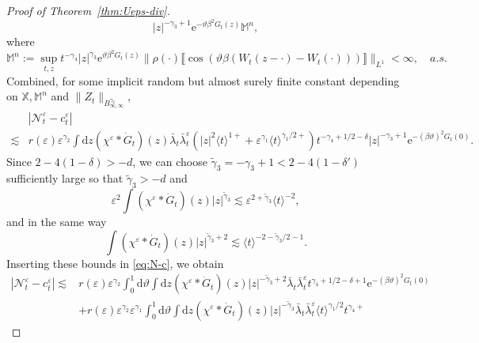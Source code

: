\documentclass[11pt, a4paper]{scrartcl}
\numberwithin{equation}{section}
\theoremstyle{plain}
\theoremstyle{remark}
\newcommand{\assign}{:=}
\newcommand{\mathd}{\mathrm{d}}
\newcommand{\mathe}{\mathrm{e}}
\begin{document}
\begin{proof}[Proof of Theorem~\ref{thm:Ueps-div}]
\[		| z |^{- \gamma_3 + 1} \mathe^{- \vartheta \beta^2 G_t (z)} \mathbb{M}^n,
	\]
	where
	\[ \mathbb{M}^n \assign \sup_{t, z} t^{- \gamma_4} | z |^{\gamma_3}
		\mathe^{\vartheta \beta^2 G_t (z)} \| \rho (\cdot) \llbracket \cos
		(\vartheta \beta (W_t (z - \cdot) - W_t (\cdot))) \rrbracket \|_{L^1}  <
		\infty, \quad a.s. \]
	Combined, for some implicit random but almost surely finite constant
	depending on $\mathbb{X}, \mathbb{M}^n$ and $\| Z_t
		\|_{B^{\gamma_2}_{\infty, \infty}}$,
	\begin{equation}
		\begin{aligned}
			         & | \mathcal{N}^{\varepsilon}_t - c_t^{\varepsilon} |  \\
			\lesssim & r (\varepsilon) \varepsilon^{\gamma_2} \int \mathd z
			(\chi^{\varepsilon} \ast \dot{G}_t ) (z) \bar{\lambda}_t
			\bar{\lambda}_t^{\varepsilon} (| z |^2 \langle t \rangle^{1 +} +
			\varepsilon^{\gamma_1} \langle t \rangle^{\gamma_1 / 2 +}) t^{- \gamma_4
					+ 1 / 2 - \delta} | z |^{- \gamma_3 + 1} \mathe^{- (\beta \vartheta)^2
				G_t (0)} .
		\end{aligned}  \label{eq:N-c}
	\end{equation}
	Since $2 - 4 (1 - \delta) > - d$, we can choose $\tilde{\gamma}_3 = -
		\gamma_3 + 1 < 2 - 4 (1 - \delta')$ sufficiently large so that
	$\tilde{\gamma}_3 > - d$ and
	\[ \varepsilon^2 \int (\chi^{\varepsilon} \ast \dot{G}_t ) (z) | z
		|^{\tilde{\gamma}_3} \lesssim \varepsilon^{2 + \tilde{\gamma}_3} \langle
		t \rangle^{- 2}, \]
	and in the same way
	\[ \int (\chi^{\varepsilon} \ast \dot{G}_t ) (z) | z |^{\tilde{\gamma}_3 +
				2} \lesssim \langle t \rangle^{- 2 - \tilde{\gamma}_3 / 2 - 1} . \]
	Inserting these bounds in \eqref{eq:N-c}, we obtain
	\[ \begin{aligned}
			| \mathcal{N}^{\varepsilon}_t - c_t^{\varepsilon} | \lesssim & r
			(\varepsilon) \varepsilon^{\gamma_2} \int_0^1 \mathd \vartheta \int
			\mathd z (\chi^{\varepsilon} \ast \dot{G}_t ) (z) | z |^{-
					\tilde{\gamma}_3 + 2} \bar{\lambda}_t \bar{\lambda}_t^{\varepsilon} t^{\gamma_4 + 1
			/ 2 - \delta + 1} \mathe^{- (\beta \vartheta)^2 G_t (0)}                                                                       \\
			                                                             & + r (\varepsilon) \varepsilon^{\gamma_2} \varepsilon^{\gamma_1}
			\int_0^1 \mathd \vartheta \int \mathd z (\chi^{\varepsilon} \ast
			\dot{G}_t ) (z) | z |^{- \tilde{\gamma}_3} \bar{\lambda}_t
			\bar{\lambda}_t^{\varepsilon} \langle t \rangle^{\gamma_1 / 2} t^{\gamma_4 +
}
\end{aligned}\]
\end{proof}
\end{document}
